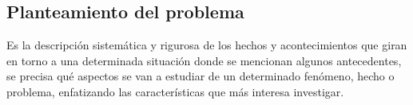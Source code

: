 \subsection{Planteamiento del problema}

Es la descripción sistemática y rigurosa de los hechos y acontecimientos que giran en torno a una determinada situación donde se mencionan algunos antecedentes, se precisa qué aspectos se van a estudiar de un determinado fenómeno, hecho o problema, enfatizando las características que más interesa investigar.


